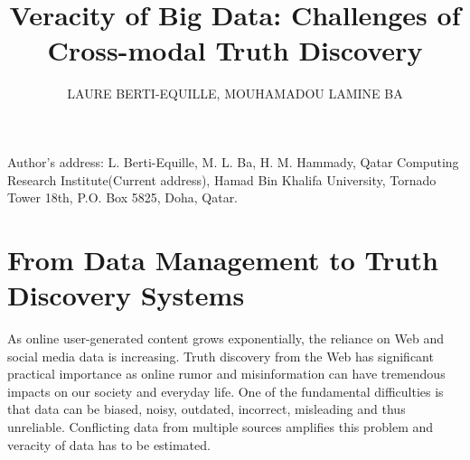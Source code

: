\documentclass[prodmode,acmtecs]{acmsmall} %
\begin{document}
\title{Veracity of Big Data: Challenges of Cross-modal Truth Discovery}
\author{LAURE BERTI-EQUILLE, MOUHAMADOU LAMINE BA
}




\begin{bottomstuff}
Author's address: L. Berti-Equille, M. L. Ba, H. M. Hammady, Qatar Computing Research Institute(Current address), Hamad
Bin Khalifa University, Tornado Tower 18th, P.O. Box 5825, Doha, Qatar.
\end{bottomstuff}

\maketitle


\section*{From Data Management to Truth Discovery Systems}
As online user-generated content grows exponentially,
the reliance on Web and social 
media data is increasing.  Truth discovery from 
the Web has significant practical importance as online rumor and misinformation
can have tremendous impacts on our society and everyday life.
One of the fundamental difficulties is that data can be biased, noisy, outdated, incorrect, misleading and
thus unreliable. Conflicting data from multiple sources amplifies this problem and veracity of data has to 
be estimated.
\end{document}
